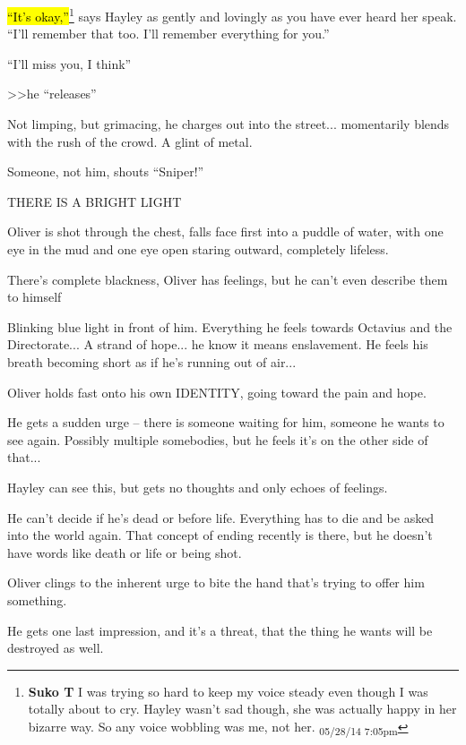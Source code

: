 \hl{``It's okay,''}\footnote{\textbf{Suko T }I was trying so hard to keep my voice steady even though I was totally about to cry.  Hayley wasn't sad though, she was actually happy in her bizarre way.  So any voice wobbling was me, not her. \textsubscript{05/28/14 7:05pm}} says Hayley as gently and lovingly as you have ever heard her speak.  ``I'll remember that too.  I'll remember everything for you.''

``I'll miss you, I think''



\textgreater \textgreater  he ``releases''

Not limping, but grimacing, he charges out into the street... momentarily blends with the rush of the crowd. A glint of metal. 

Someone, not him, shouts ``Sniper!''

THERE IS A BRIGHT LIGHT

Oliver is shot through the chest, falls face first into a puddle of water, with one eye in the mud and one eye open staring outward, completely lifeless.



There's complete blackness, Oliver has feelings, but he can't even describe them to himself

Blinking blue light in front of him.  Everything he feels towards Octavius and the Directorate... A strand of hope... he know it means enslavement. He feels his breath becoming short as if he's running out of air...

Oliver holds fast onto his own IDENTITY, going toward the pain and hope. 

He gets a sudden urge -- there is someone waiting for him, someone he wants to see again. Possibly multiple somebodies, but he feels it's on the other side of that...



Hayley can see this, but gets no thoughts and only echoes of feelings.



He can't decide if he's dead or before life. Everything has to die and be asked into the world again.  That concept of ending recently is there, but he doesn't have words like death or life or being shot.



Oliver clings to the inherent urge to bite the hand that's trying to offer him something. 



He gets one last impression, and it's a threat, that the thing he wants will be destroyed as well. 



